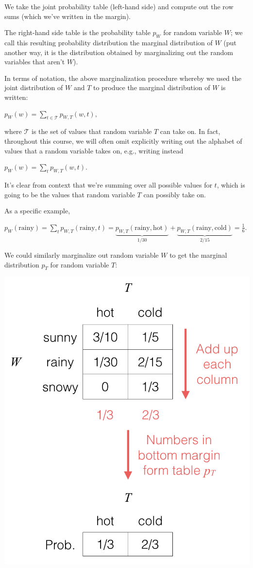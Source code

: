 \documentclass[6008notes.tex]{subfiles}
\begin{document}
We take the joint probability table (left-hand side) and compute out the row sums (which we've written in the margin).

The right-hand side table is the probability table $p_W$ for random variable $W$; we call this resulting probability distribution the marginal distribution of $W$ (put another way, it is the distribution obtained by marginalizing out the random variables that aren't $W$).

In terms of notation, the above marginalization procedure whereby we used the joint distribution of $W$ and $T$ to produce the marginal distribution of $W$ is written:

$p_{W}(w)=\sum _{t\in \mathcal{T}}p_{W,T}(w,t),$
 
where $\mathcal{T}$ is the set of values that random variable $T$ can take on. In fact, throughout this course, we will often omit explicitly writing out the alphabet of values that a random variable takes on, e.g., writing instead

$p_{W}(w)=\sum _{t}p_{W,T}(w,t).$
 
It's clear from context that we're summing over all possible values for $t$, which is going to be the values that random variable $T$ can possibly take on.

As a specific example,

$p_{W}(\text {rainy})=\sum _{t}p_{W,T}(\text {rainy},t)=\underbrace{p_{W,T}(\text {rainy},\text {hot})}_{1/30}+\underbrace{p_{W,T}(\text {rainy},\text {cold})}_{2/15}=\frac{1}{6}.$
 
We could similarly marginalize out random variable $W$ to get the marginal distribution $p_T$ for random variable $T$:

{\centering\includegraphics[scale=0.4]{images_sec-joint-rv-marg-cols}}
\end{document}

